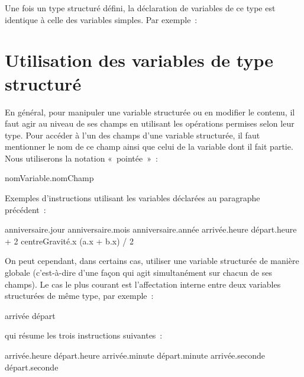 		Une fois un type structuré défini, 
		la déclaration de variables de ce type 
		est identique à celle des variables simples. 
		Par exemple~:
	
		\begin{LDA}
		\end{LDA}
	
	\section{Utilisation des variables de type structuré}
	
		En général, 
		pour manipuler une variable structurée ou en modifier le contenu, 
		il faut agir au niveau de ses champs en utilisant 
		les opérations permises selon leur type. 
		Pour accéder à l’un des champs d’une variable structurée, 
		il faut mentionner le nom de ce champ 
		ainsi que celui de la variable dont il fait partie.
		Nous utiliserons la notation «~pointée~»~:
	
		\begin{LDA}
		\Stmt nomVariable.nomChamp
		\end{LDA}
	
		Exemples d’instructions utilisant les variables
		déclarées au paragraphe précédent~:
	
		\begin{LDA}
		\Let anniversaire.jour \Gets 15
		\Let anniversaire.mois \Gets 10
		\Let anniversaire.année \Gets 2014
		\Let arrivée.heure \Gets départ.heure + 2
		\Let centreGravité.x \Gets (a.x + b.x) / 2
		\end{LDA}
	
		On peut cependant, dans certains cas, 
		utiliser une variable structurée de manière globale 
		(c’est-à-dire d’une façon qui agit simultanément sur chacun de ses champs). 
		Le cas le plus courant est l’affectation interne 
		entre deux variables structurées de même type, 
		par exemple~:
	
		\begin{LDA}
		\Let arrivée \Gets départ
		\end{LDA}
	
		qui résume les trois instructions suivantes~:
	
		\begin{LDA}
		\Let arrivée.heure \Gets départ.heure
		\Let arrivée.minute \Gets départ.minute
		\Let arrivée.seconde \Gets départ.seconde
		\end{LDA}
		
